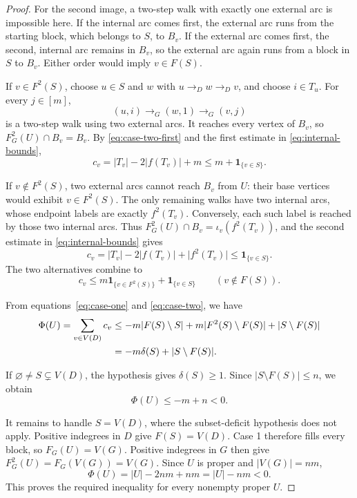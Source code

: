 \documentclass[11pt]{article}
\newcommand{\abs}[1]{\lvert#1\rvert}
\newcommand{\ind}[1]{\mathbf 1_{\{#1\}}}
\begin{document}
\begin{proof}
For the second image, a two-step walk with exactly one external arc
is impossible here. If the internal arc comes first, the external arc
runs from the starting block, which belongs to $S$, to $B_v$.
If the external arc comes first, the second, internal arc remains in
$B_v$, so the external arc again runs from a block in $S$ to $B_v$.
Either order would imply $v\in F(S)$.

If $v\in F^2(S)$, choose $u\in S$ and $w$ with
$u\to_Dw\to_Dv$, and choose $i\in T_u$. For every $j\in[m]$,
\[
                    (u,i)\to_G(w,1)\to_G(v,j)
\]
is a two-step walk using two external arcs. It reaches every vertex
of $B_v$, so $F_G^2(U)\cap B_v=B_v$. By
\eqref{eq:case-two-first} and the first estimate in
\eqref{eq:internal-bounds},
\[
                  c_v=\abs{T_v}-2\abs{f(T_v)}+m
                        \le m+\ind{v\in S}.
\]

If $v\notin F^2(S)$, two external arcs cannot reach $B_v$ from $U$:
their base vertices would exhibit $v\in F^2(S)$. The only remaining
walks have two internal arcs, whose endpoint labels are exactly
$f^2(T_v)$. Conversely, each such label is reached by those two
internal arcs. Thus $F_G^2(U)\cap B_v=\iota_v(f^2(T_v))$, and the
second estimate in \eqref{eq:internal-bounds} gives
\[
             c_v=\abs{T_v}-2\abs{f(T_v)}+\abs{f^2(T_v)}
                          \le\ind{v\in S}.
\]
The two alternatives combine to
\begin{equation}
 c_v\le m\ind{v\in F^2(S)}+\ind{v\in S}
                         \qquad(v\notin F(S)).
 \label{eq:case-two}
\end{equation}

From equations~\eqref{eq:case-one} and \eqref{eq:case-two}, we have
\begin{align}
 \Phi(U)=\sum_{v\in V(D)}c_v
 &\le -m\abs{F(S)\setminus S}
       +m\abs{F^2(S)\setminus F(S)}
       +\abs{S\setminus F(S)}\notag\\
 &=-m\delta(S)+\abs{S\setminus F(S)}.
 \label{eq:proof-budget}
\end{align}

If $\varnothing\ne S\subsetneq V(D)$, the hypothesis gives $\delta(S)\ge 1$. Since
$\abs{S\setminus F(S)}\le n$, we obtain
\[
                         \Phi(U)\le-m+n<0.
\]

It remains to handle $S=V(D)$, where the subset-deficit hypothesis does not
apply. Positive indegrees in $D$ give $F(S)=V(D)$.
Case 1 therefore fills every block, so $F_G(U)=V(G)$. Positive
indegrees in $G$ then give $F_G^2(U)=F_G(V(G))=V(G)$. Since $U$
is proper and $\abs{V(G)}=nm$,
\[
                  \Phi(U)=\abs U-2nm+nm=\abs U-nm<0.
\]
This proves the required inequality for every nonempty proper $U$.
\end{proof}
\end{document}
